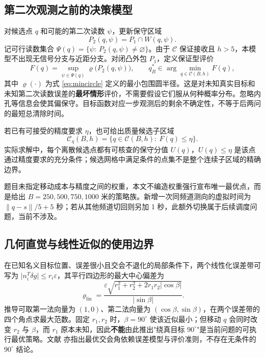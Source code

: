 \subsection{第二次观测之前的决策模型}

对候选点 $q$ 和可能的第二次读数 $\psi$，更新保守区域
\begin{equation}
  P_2(q,\psi)=P_1\cap W(q,\psi).
  \label{eq:P2}
\end{equation}
记可行读数集合 $\Psi(q)=\{\psi:\ P_2(q,\psi)\ne\varnothing\}$。由于 $\mathcal{C}$ 保证接收且 $h>5$，本模型不出现无信号分支与近距分支。对闭凸外包 $P_1$，定义保证型评价
\begin{equation}
  F(q)=\sup_{\psi\in\Psi(q)}\varrho\bigl(P_2(q,\psi)\bigr),\qquad
  q_B^*\in\arg\min_{q\in\mathcal{C}(B,h)}F(q),
  \label{eq:F-model}
\end{equation}
其中 $\varrho(\cdot)$ 为式 \eqref{eq:mincircle} 定义的最小包围圆半径。这是对未知真实目标和未知第二次读数误差的\textbf{最坏情形}评价，不需要假设它们服从何种概率分布。忽略内孔等信息会使其偏保守。目标函数对应一步观测后的剩余不确定性，不等于后两问的最短总清除时间。

若已有可接受的精度要求 $\eta$，也可给出质量候选子区域
\begin{equation}
  \mathcal{C}_\eta(B,h)=\{q\in\mathcal{C}(B,h):\ F(q)\le\eta\}.
  \label{eq:C-eta}
\end{equation}
实际求解中，每个离散候选点都有可核查的保守分值 $U(q)$，$U(q)\le\eta$ 是该点通过精度要求的充分条件；候选网格中满足条件的点集不是整个连续子区域的精确边界。

题目未指定移动成本与精度之间的权重，本文不编造权重强行宣布唯一最优点，而是给出 $B=250,500,750,1000$ 米的策略族。新增一次同频道测向的虚拟时间为 $\lVert q-s\rVert/5+5$ 秒；若从其他频道切回则另加 1 秒，此额外切换属于后续调度问题，当前不涉及。

\subsection{几何直觉与线性近似的使用边界}

在已知名义目标位置、误差很小且交会不退化的局部条件下，两个线性化误差带可写为 $\lvert n_i^{T}\delta g\rvert\le r_i\varepsilon$，其平行四边形的最大中心偏差为
\begin{equation}
  \varrho_{\text{lin}}=\frac{\varepsilon\sqrt{r_1^2+r_2^2+2r_1r_2\lvert\cos\beta\rvert}}{\lvert\sin\beta\rvert}.
  \label{eq:linear-approx}
\end{equation}
推导可取第一法向量为 $(1,0)$、第二法向量为 $(\cos\beta,\sin\beta)$，在两个误差带的四个角点求最大范数。固定 $r_1,r_2$ 时，$\beta=90^\circ$ 使该近似最小；但移动 $q$ 会同时改变 $r_2$ 与 $\beta$，而 $r_1$ 原本未知，因此\textbf{不能}由此推出"绕真目标 $90^\circ$"是当前问题的可执行最优策略。文献 \cite{Bai2009,Sheng2016} 亦指出最优交会角依赖误差模型与评价准则，不存在无条件的 $90^\circ$ 结论。

